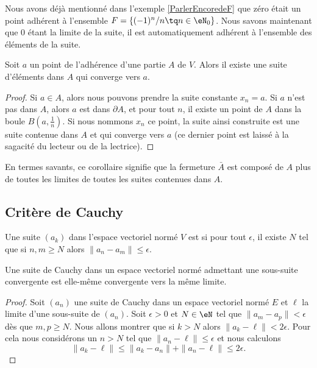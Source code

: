 Nous avons déjà mentionné dans l'exemple \ref{ParlerEncoredeF} que zéro était un point adhérent à l'ensemble $F=\{ (-1)^n/n\tq n\in\eN_0 \}$. Nous savons maintenant que $0$ étant la limite de la suite, il est automatiquement adhérent à l'ensemble des éléments de la suite.

\begin{corollary}		\label{CorAdhEstLim}
	Soit $a$ un point de l'adhérence d'une partie $A$ de $V$. Alors il existe une suite d'éléments dans $A$ qui converge vers $a$.
\end{corollary}

\begin{proof}
	Si $a\in A$, alors nous pouvons prendre la suite constante $x_n=a$. Si $a$ n'est pas dans $A$, alors $a$ est dans $\partial A$, et pour tout $n$, il existe un point de $A$ dans la boule $B(a,\frac{1}{ n })$. Si nous nommons $x_n$ ce point, la suite ainsi construite est une suite contenue dans $A$ et qui converge vers $a$ (ce dernier point est laissé à la sagacité du lecteur ou de la lectrice).
\end{proof}

En termes savants, ce corollaire signifie que la fermeture $\bar A$ est composé de $A$ plus de toutes les limites de toutes les suites contenues dans $A$.

\subsection{Critère de Cauchy}

\begin{definition}
    Une suite \( (a_k)\) dans l'espace vectoriel normé \( V\) est  si pour tout \( \epsilon\), il existe \( N\) tel que si \( n,m\geq N\) alors \( \| a_n-a_m \|\leq \epsilon\).
\end{definition}

\begin{lemma}
    Une suite de Cauchy dans un espace vectoriel normé admettant une sous-suite convergente est elle-même convergente vers la même limite.
\end{lemma}

\begin{proof}
    Soit \( (a_n)\) une suite de Cauchy dans un espace vectoriel normé \( E\) et \( \ell\) la limite d'une sous-suite de \( (a_n)\). Soit \( \epsilon>0\) et \( N\in \eN\) tel que \( \| a_m-a_p \|<\epsilon\) dès que \( m,p\geq N\). Nous allons montrer que si \( k>N\) alors \( \| a_k-\ell \|<2\epsilon\). Pour cela nous considérons un \( n>N\) tel que \( \| a_n-\ell \|\leq \epsilon\) et nous calculons
    \begin{equation}
        \| a_k-\ell \|\leq \| a_k-a_n \|+\| a_n-\ell \|\leq 2\epsilon.
    \end{equation}
\end{proof}

